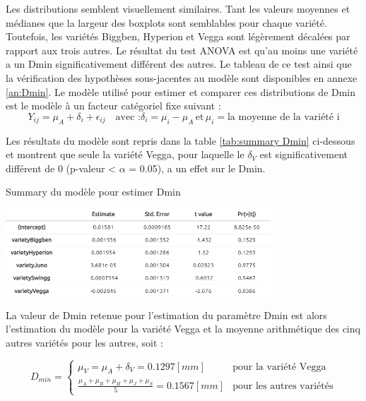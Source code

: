 Les distributions semblent visuellement similaires.
Tant les valeurs moyennes et médianes que la largeur des boxplots sont semblables pour chaque variété.
Toutefois, les variétés Biggben, Hyperion et Vegga sont légèrement décalées par rapport aux trois autres.
Le résultat du test ANOVA est qu'au moins une variété a un Dmin significativement différent des autres.
Le tableau de ce test ainsi que la vérification des hypothèses sous-jacentes au modèle sont disponibles en annexe \ref{an:Dmin}.
Le modèle utilisé pour estimer et comparer ces distributions de Dmin est le modèle à un facteur catégoriel fixe suivant :
\begin{equation}
    Y_{ij} = \mu_{A}+\delta_{i}+\epsilon_{ij} \quad \text{avec :} \delta_{i}=\mu_{i}-\mu_{A} \, \text{et} \, \mu_{i} = \text{la moyenne de la variété i}
\end{equation}

Les résultats du modèle sont repris dans la table \ref{tab:summary Dmin} ci-dessous et montrent que seule la variété Vegga, pour laquelle le $\delta_{V}$ est significativement différent de 0 (p-valeur < $\alpha$ = 0.05), a un effet sur le Dmin.

\begin{table}[ht]
    \centering
    \caption{Summary du modèle pour estimer Dmin}
    \includegraphics[width=0.75\textwidth]{Image/summary Dmin.png}
    \label{tab:summary Dmin}
\end{table}

La valeur de Dmin retenue pour l'estimation du paramètre Dmin est alors l'estimation du modèle pour la variété Vegga et la moyenne arithmétique des cinq autres variétés pour les autres, soit :

\begin{equation}
    D_{min} = 
    \begin{cases}
        \mu_{V} = \mu_{A}+\delta_{V} = 0.1297 [mm] & \text{pour la variété Vegga} \\
        \frac{\mu_{A}+\mu_{B}+\mu_{H}+\mu_{J}+\mu_{S}}{5}=0.1567 [mm] & \text{pour les autres variétés}
    \end{cases}
\end{equation}

